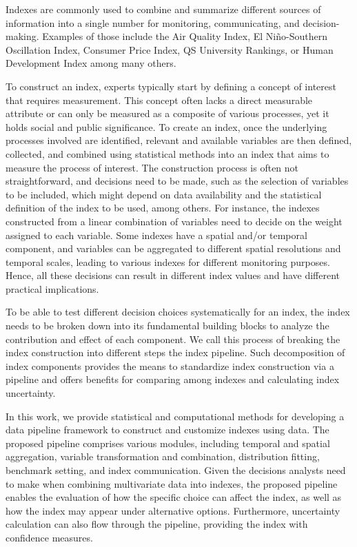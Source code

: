 \documentclass[
]{interact}
\begin{document}
Indexes are commonly used to combine and summarize different sources of
information into a single number for monitoring, communicating, and
decision-making. Examples of those include the Air Quality Index, El
Niño-Southern Oscillation Index, Consumer Price Index, QS University
Rankings, or Human Development Index among many others.

To construct an index, experts typically start by defining a concept of
interest that requires measurement. This concept often lacks a direct
measurable attribute or can only be measured as a composite of various
processes, yet it holds social and public significance. To create an
index, once the underlying processes involved are identified, relevant
and available variables are then defined, collected, and combined using
statistical methods into an index that aims to measure the process of
interest. The construction process is often not straightforward, and
decisions need to be made, such as the selection of variables to be
included, which might depend on data availability and the statistical
definition of the index to be used, among others. For instance, the
indexes constructed from a linear combination of variables need to
decide on the weight assigned to each variable. Some indexes have a
spatial and/or temporal component, and variables can be aggregated to
different spatial resolutions and temporal scales, leading to various
indexes for different monitoring purposes. Hence, all these decisions
can result in different index values and have different practical
implications.

To be able to test different decision choices systematically for an
index, the index needs to be broken down into its fundamental building
blocks to analyze the contribution and effect of each component. We call
this process of breaking the index construction into different steps the
index pipeline. Such decomposition of index components provides the
means to standardize index construction via a pipeline and offers
benefits for comparing among indexes and calculating index uncertainty.

In this work, we provide statistical and computational methods for
developing a data pipeline framework to construct and customize indexes
using data. The proposed pipeline comprises various modules, including
temporal and spatial aggregation, variable transformation and
combination, distribution fitting, benchmark setting, and index
communication. Given the decisions analysts need to make when combining
multivariate data into indexes, the proposed pipeline enables the
evaluation of how the specific choice can affect the index, as well as
how the index may appear under alternative options. Furthermore,
uncertainty calculation can also flow through the pipeline, providing
the index with confidence measures.
\end{document}
